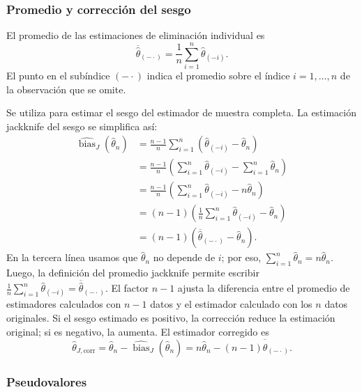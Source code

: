 

\subsubsection{Promedio y corrección del sesgo}

El promedio de las estimaciones de eliminación individual es
\[
    \overline{\widehat\theta}_{(-\cdot)}
    =\frac{1}{n}\sum_{i=1}^{n}\widehat\theta_{(-i)}.
\]
El punto en el subíndice $(-\cdot)$ indica el promedio sobre el índice
$i=1,\ldots,n$ de la observación que se omite.

Se utiliza para estimar el sesgo del estimador de muestra completa.
La estimación jackknife del sesgo se simplifica así:
\[
\begin{aligned}
    \widehat{\operatorname{bias}}_{J}(\widehat\theta_n)
    &=\frac{n-1}{n}\sum_{i=1}^{n}
      \left(\widehat\theta_{(-i)}-\widehat\theta_n\right)\\
    &=\frac{n-1}{n}\left(
      \sum_{i=1}^{n}\widehat\theta_{(-i)}
      -\sum_{i=1}^{n}\widehat\theta_n\right)\\
    &=\frac{n-1}{n}\left(
      \sum_{i=1}^{n}\widehat\theta_{(-i)}-n\widehat\theta_n\right)\\
    &=(n-1)\left(
      \frac{1}{n}\sum_{i=1}^{n}\widehat\theta_{(-i)}
      -\widehat\theta_n\right)\\
    &=(n-1)\left(
      \overline{\widehat\theta}_{(-\cdot)}-\widehat\theta_n\right).
\end{aligned}
\]
En la tercera línea usamos que $\widehat\theta_n$ no depende de $i$; por eso,
$\sum_{i=1}^{n}\widehat\theta_n=n\widehat\theta_n$. Luego, la definición del
promedio jackknife permite escribir
$\frac{1}{n}\sum_{i=1}^{n}\widehat\theta_{(-i)}=
\overline{\widehat\theta}_{(-\cdot)}$.
El factor $n-1$ ajusta la diferencia entre el promedio de estimadores
calculados con $n-1$ datos y el estimador calculado con los $n$ datos
originales. Si el sesgo estimado es positivo, la corrección reduce la
estimación original; si es negativo, la aumenta. El estimador corregido es
\[
    \widehat\theta_{J,\mathrm{corr}}
    =\widehat\theta_n-
      \widehat{\operatorname{bias}}_{J}(\widehat\theta_n)
    =n\widehat\theta_n-(n-1)
      \overline{\widehat\theta}_{(-\cdot)}.
\]

\subsubsection{Pseudovalores}


